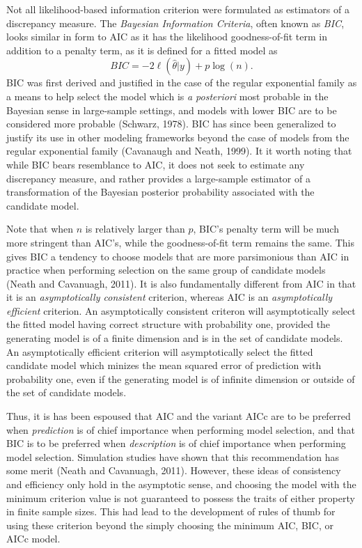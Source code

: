 		Not all likelihood-based information criterion were formulated as estimators of a discrepancy measure. The \textit{Bayesian Information Criteria}, often known as \textit{BIC}, looks similar in
		form to AIC as it has the likelihood goodness-of-fit term in addition to a penalty term, as it is defined for a fitted model as
		\begin{equation}
			BIC = -2 \ell(\hat{\theta}|y) + p \log (n).
		\end{equation}
		BIC was first derived and justified in the case of the regular exponential family as a means to help select the model which is \textit{a posteriori} most probable in the Bayesian sense in
		large-sample settings, and models with lower BIC are to be considered more probable (Schwarz, 1978). BIC has since been generalized to justify its use in other modeling frameworks beyond
		the case of models from the regular exponential family (Cavanaugh and Neath, 1999). It it worth noting that while BIC bears resemblance to AIC, it does not seek to estimate any discrepancy
		measure, and rather provides a large-sample estimator of a transformation of the Bayesian posterior probability associated with the candidate model.

		Note that when $n$ is relatively larger than $p$, BIC's penalty term will be much more stringent than AIC's, while the goodness-of-fit term remains the same. This gives BIC a tendency to
		choose models that are more parsimonious than AIC in practice when performing selection on the same group of candidate models (Neath and Cavanuagh, 2011). It is also fundamentally different
		from AIC in that it is an \textit{asymptotically consistent} criterion,  whereas AIC is an \textit{asymptotically efficient} criterion. An asymptotically consistent criteron will asymptotically
		select the fitted model having correct structure with probability one, provided the generating model is of a finite dimension and is in the set of candidate models. An asymptotically efficient
		criterion will asymptotically select the fitted candidate model which minizes the mean squared error of prediction with probability one, even if the generating model is of infinite dimension or outside of the
		set of candidate models.

		Thus, it is has been espoused that AIC and the variant AICc are to be preferred when \textit{prediction} is of chief importance when performing model selection, and that BIC is to be preferred
		when \textit{description} is of chief importance when performing model selection. Simulation studies have shown that this recommendation has some merit (Neath and Cavanuagh, 2011). However, these
		ideas of consistency and efficiency only hold in the asymptotic sense, and choosing the model with the minimum criterion value is not guaranteed to possess the traits of either property in
		finite sample sizes. This had lead to the development of rules of thumb for using these criterion beyond the simply choosing the minimum AIC, BIC, or AICc model.

